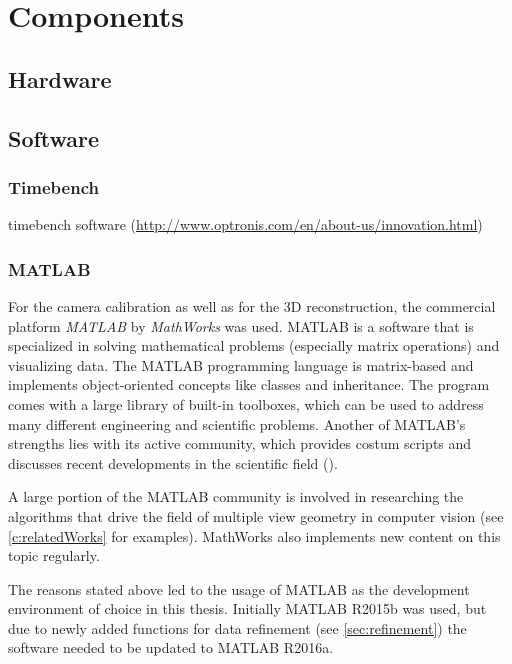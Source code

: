 \chapter{Components} \label{c:Components}
\section{Hardware} \label{sec:Hardware}

\section{Software} \label{sec:Software}

\subsection{Timebench} \label{ssec:Timebench}
timebench software (\url{http://www.optronis.com/en/about-us/innovation.html})

\subsection{MATLAB} \label{ssec:Matlab}
For the camera calibration as well as for the 3D reconstruction, the commercial platform \textit{MATLAB} by \textit{MathWorks} was used. MATLAB is a software that is specialized in solving mathematical problems (especially matrix operations) and visualizing data. The MATLAB programming language is matrix-based and implements object-oriented concepts like classes and inheritance. The program comes with a large library of built-in toolboxes, which can be used to address many different engineering and scientific problems. Another of MATLAB's strengths lies with its active community, which provides costum scripts and discusses recent developments in the scientific field (\cite{MathWorks.2016}).

A large portion of the MATLAB community is involved in researching the algorithms that drive the field of multiple view geometry in computer vision (see \autoref{c:relatedWorks} for examples). MathWorks also implements new content on this topic regularly. 

The reasons stated above led to the usage of MATLAB as the development environment of choice in this thesis. Initially MATLAB R2015b was used, but due to newly added functions for data refinement (see \autoref{sec:refinement}) the software needed to be updated to MATLAB R2016a.
   
